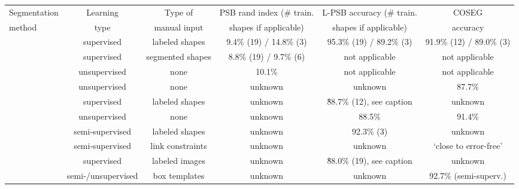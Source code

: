 \begin{table*}[t!]
\small
  \centering
    \begin{tabular*}{\textwidth}{l|c|c|c|c|c@{}}
    \hline
    Segmentation                & Learning           & Type of          & PSB rand index (\# train. & L-PSB  accuracy (\# train.  & COSEG          \\
    method                      & type               & manual input     & shapes if applicable)     & shapes if applicable)       & accuracy       \\
    \hline
    \hline
    \cite{Kalogerakis:2010:LMS} & supervised         & labeled shapes   & 9.4\% (19) / 14.8\% (3)   & 95.3\% (19) / 89.2\% (3)    & 91.9\% (12) / 89.0\% (3) \\
    \hline
    \cite{Benhabiles:2011:LBE}  & supervised         & segmented shapes & 8.8\% (19) / 9.7\% (6)    & not applicable              & not applicable \\
    \hline
    \cite{Huang:2011:JSS}       & unsupervised       & none             & 10.1\%                    & not applicable              & not applicable \\
    \hline
    \cite{Sidi:2011:CS}         & unsupervised       & none             & unknown                   & unknown                     & 87.7\%         \\
    \hline
    \cite{van-Kaick:2011:PKC}   & supervised         & labeled shapes   & unknown                   & \~88.7\% (12), see caption   & unknown        \\
    \hline
    \cite{Hu:2012:CSS}          & unsupervised       & none             & unknown                   & 88.5\%                      & 91.4\%         \\
    \hline
    \cite{Lv:2012:SMS}          & semi-supervised    & labeled shapes   & unknown                   & 92.3\% (3)                  & unknown        \\
    \hline
    \cite{Wang:2012:ACS}        & semi-supervised    & link constraints & unknown                   & unknown                     & `close to error-free' \\
    \hline
    \cite{Wang:2013:PAS}        & supervised         & labeled images   & unknown                   & \~88.0\% (19), see caption   & unknown               \\
    \hline
    \cite{Kim:2013:lpt}         & semi-/unsupervised & box templates    & unknown                   & unknown                     & 92.7\% (semi-superv.) \\

\end{tabular*}
\end{table*}
